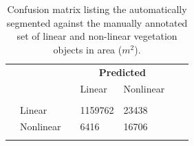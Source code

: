 
\begin{table}
	\caption{Confusion matrix listing the automatically segmented against the manually annotated set of linear and non-linear vegetation objects in area (\(m^{2}\)).}
	\label{tab:confmatseg}
	\begin{tabular}{l l l l l l l}
		\toprule
		& & & \multicolumn{2}{c}{\textbf{Predicted}} & & \\
		& & & Linear & Nonlinear & & \\
		\midrule
		\parbox[t]{2mm}{} & & & & & & \\
		& Linear & & 1159762 & 23438 & & \\
		& Nonlinear & & 6416 & 16706 & & \\
		& & & & & & \\
		\bottomrule
	\end{tabular}
\end{table}